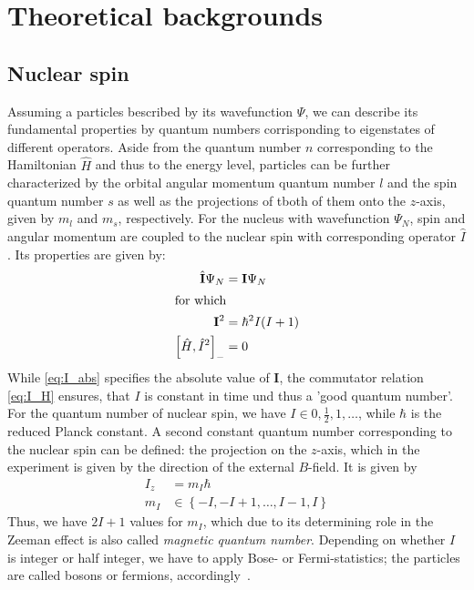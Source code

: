 \section{Theoretical backgrounds}
\subsection{Nuclear spin}
Assuming a particles bescribed by its wavefunction $\Psi$, we can describe 
its fundamental properties by quantum numbers corrisponding to eigenstates
of different operators. Aside from the quantum number $n$ corresponding to the 
Hamiltonian $\hat{H}$ and thus to the energy level, particles can be further characterized 
by the orbital angular momentum quantum number $l$ and the spin quantum number 
$s$ as well as the projections of tboth of them onto the $z$-axis, given by 
$m_l$ and $m_s$, respectively. For the nucleus with wavefunction $\Psi_N$, 
spin and angular momentum are coupled to the 
nuclear spin with corresponding operator $\hat{I}$. Its properties are given by:
\begin{align}
    \hat{\mathbf{I}} \Psi_N &= \mathbf{I} \Psi_N \\ 
\intertext{for which}
    \mathbf{I}^2 &= \hbar^2 I(I + 1)
    \label{eq:I_abs}\\
    \left[\hat{H}, \hat{I}^2\right]_- &= 0 
    \label{eq:I_H}\\
\end{align}
While \eqref{eq:I_abs} specifies the absolute value of $\mathbf{I}$, the commutator relation 
\eqref{eq:I_H} ensures, that $I$ is constant in time und thus a 'good quantum number'.
For the quantum number of nuclear spin, we have $I \in {0, \frac{1}{2}, 1, \ldots}$, while $\hbar$ is the 
reduced Planck constant. A second constant quantum number corresponding to the nuclear spin can be defined:
the projection on the $z$-axis, which in the experiment is given by the direction of the external $B$-field.
It is given by
\begin{align}
    I_z &= m_I \hbar \\
    m_I &\in \left\{-I, -I + 1, \ldots, I - 1, I\right\}
\end{align}
Thus, we have $2I + 1$ values for $m_I$, which due to its determining role in the Zeeman effect is 
also called \emph{magnetic quantum number}. Depending on whether $I$ is integer or half integer, 
we have to apply Bose- or Fermi-statistics; the particles are called bosons or fermions, 
accordingly~\cite{dem}.

